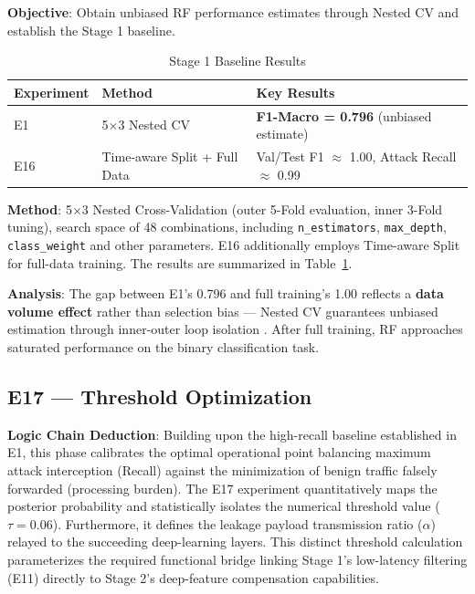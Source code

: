 \documentclass[sigconf]{acmart}
\begin{document}
\textbf{Objective}: Obtain unbiased RF performance estimates through Nested CV and establish the Stage 1 baseline.


\begin{table}[!t]
\caption{Stage 1 Baseline Results}
\label{tab:s1_baseline}
\begin{tabular}{p{1.5cm}p{5.5cm}p{9.5cm}}
\toprule
\textbf{Experiment} & \textbf{Method} & \textbf{Key Results} \\
\midrule
E1 & 5$\times$3 Nested CV & \textbf{F1-Macro = 0.796} (unbiased estimate) \\
E16 & Time-aware Split + Full Data & Val/Test F1 $\approx$ 1.00, Attack Recall $\approx$ 0.99 \\
\bottomrule
\end{tabular}
\end{table}

\textbf{Method}: 5$\times$3 Nested Cross-Validation (outer 5-Fold evaluation, inner 3-Fold tuning), search space of 48 combinations, including \texttt{n\_estimators}, \texttt{max\_depth}, \texttt{class\_weight} and other parameters. E16 additionally employs Time-aware Split for full-data training. The results are summarized in Table~\ref{tab:s1_baseline}.

\textbf{Analysis}: The gap between E1's 0.796 and full training's 1.00 reflects a \textbf{data volume effect} rather than selection bias --- Nested CV guarantees unbiased estimation through inner-outer loop isolation \cite{12}. After full training, RF approaches saturated performance on the binary classification task.

\subsection{E17 --- Threshold Optimization}
\textbf{Logic Chain Deduction}: Building upon the high-recall baseline established in E1, this phase calibrates the optimal operational point balancing maximum attack interception (Recall) against the minimization of benign traffic falsely forwarded (processing burden). The E17 experiment quantitatively maps the posterior probability and statistically isolates the numerical threshold value ($\tau=0.06$). Furthermore, it defines the leakage payload transmission ratio ($\alpha$) relayed to the succeeding deep-learning layers. This distinct threshold calculation parameterizes the required functional bridge linking Stage 1's low-latency filtering (E11) directly to Stage 2's deep-feature compensation capabilities.
\end{document}
